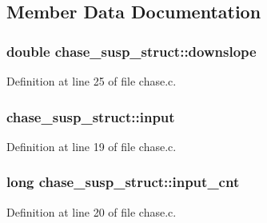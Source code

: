 \subsection{Member Data Documentation}
\subsubsection[{\texorpdfstring{downslope}{downslope}}]{\setlength{\rightskip}{0pt plus 5cm}double chase\+\_\+susp\+\_\+struct\+::downslope}\hypertarget{structchase__susp__struct_a6d618e4bad4c99f09364451fa85853e8}{}\label{structchase__susp__struct_a6d618e4bad4c99f09364451fa85853e8}


Definition at line 25 of file chase.\+c.

\subsubsection[{\texorpdfstring{input}{input}}]{ chase\+\_\+susp\+\_\+struct\+::input}\hypertarget{structchase__susp__struct_a41d177ed777f1cc0494127c2bce4cb38}{}\label{structchase__susp__struct_a41d177ed777f1cc0494127c2bce4cb38}


Definition at line 19 of file chase.\+c.

\subsubsection[{\texorpdfstring{input\+\_\+cnt}{input_cnt}}]{\setlength{\rightskip}{0pt plus 5cm}long chase\+\_\+susp\+\_\+struct\+::input\+\_\+cnt}\hypertarget{structchase__susp__struct_ab8642a9980a098f2d80bd18f573b71d2}{}\label{structchase__susp__struct_ab8642a9980a098f2d80bd18f573b71d2}


Definition at line 20 of file chase.\+c.

